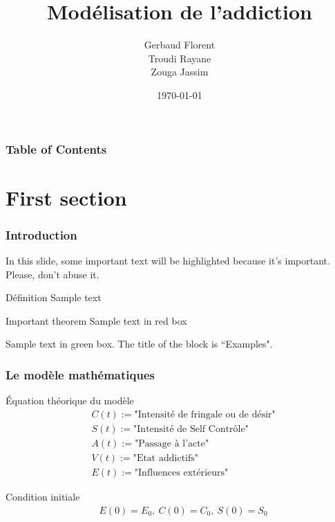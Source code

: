 \documentclass{beamer}
\title{Modélisation de l'addiction}
\author{Gerbaud Florent \\ Troudi Rayane \\ Zouga Jassim}
\institute{Polyteh Nice}
\date{\today}
\begin{document}
	
	\frame{\titlepage}
	
	\begin{frame}
		\frametitle{Table of Contents}
		\tableofcontents
	\end{frame}
	
	
	\section{First section}
	
	\begin{frame}
		\frametitle{Introduction}
		
		In this slide, some important text will be
		\alert{highlighted} because it's important.
		Please, don't abuse it.
		
		\begin{block}{Définition}
			Sample text
		\end{block}
		
		\begin{alertblock}{Important theorem}
			Sample text in red box
		\end{alertblock}
		
		\begin{examples}
			Sample text in green box. The title of the block is ``Examples".
		\end{examples}
	\end{frame}
	
	
\begin{frame}
	\frametitle{Le modèle mathématiques}
	\begin{block}{Équation théorique du modèle}
		\begin{align*}
			&C(t) :=\text{"Intensité de fringale ou de désir"} \\
			&S(t):=\text{"Intensité de Self Contrôle"} \\
			&A(t):=\text{"Passage à l'acte"}\\
			&V(t):=\text{"Etat addictifs"} \\
			&E(t):=\text{"Influences extérieurs"} 
		\end{align*}
	\end{block}
	\begin{block}{Condition initiale}
		\begin{align*}
			&E(0)=E_0, \ C(0)=C_0, \ S(0)=S_0
		\end{align*}
	\end{block}
\end{frame}
\end{document}
